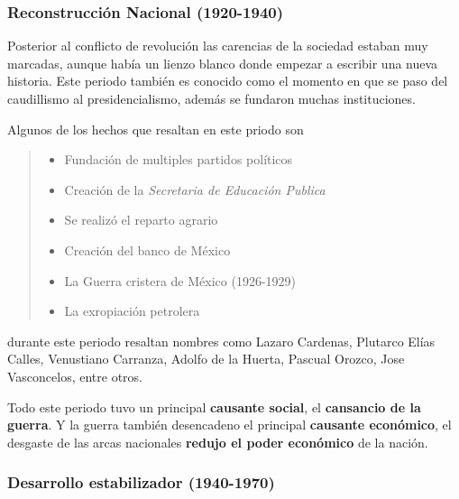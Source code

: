 \documentclass[12pt]{article}
\begin{document}
	\subsubsection*{Reconstrucci\'on Nacional (1920-1940)}
	
		\par Posterior al conflicto de revoluci\'on las carencias de la sociedad estaban muy marcadas, aunque hab\'ia un lienzo blanco donde empezar a escribir una nueva historia. Este periodo tambi\'en es conocido como el momento en que se paso del caudillismo al presidencialismo, adem\'as se fundaron muchas instituciones.
		\par Algunos de los hechos que resaltan en este priodo son
		
		\begin{quote}\begin{itemize}
			\item Fundaci\'on de multiples partidos pol\'iticos
			\item Creaci\'on de la \textit{Secretaria de Educaci\'on Publica}
			\item Se realiz\'o el reparto agrario
			\item Creaci\'on del banco de M\'exico
			\item La Guerra cristera de M\'exico (1926-1929)
			\item La exropiaci\'on petrolera
		\end{itemize}\end{quote}
		durante este periodo resaltan nombres como Lazaro Cardenas, Plutarco El\'ias Calles, Venustiano Carranza, Adolfo de la Huerta, Pascual Orozco, Jose Vasconcelos, entre otros.
		\par Todo este periodo tuvo un principal \textbf{causante social}, el \textbf{cansancio de la guerra}. Y la guerra tambi\'en desencadeno el principal \textbf{causante econ\'omico}, el desgaste de las arcas nacionales \textbf{redujo el poder econ\'omico} de la naci\'on.
		
	
	\subsubsection*{Desarrollo estabilizador (1940-1970)}
	
\end{document}
